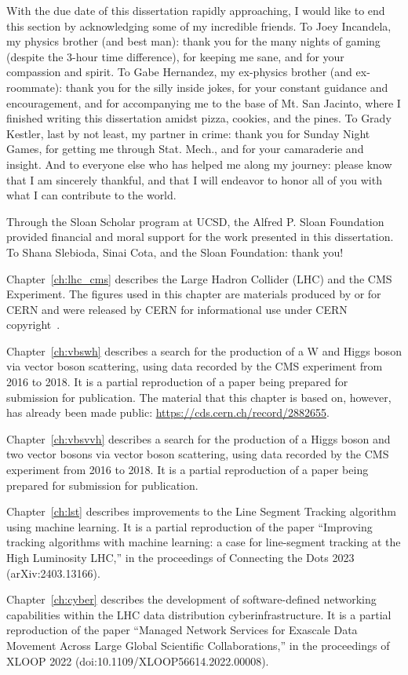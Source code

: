 \begin{acknowledgements}
With the due date of this dissertation rapidly approaching, I would like to end this section by acknowledging some of my incredible friends. 
To Joey Incandela, my physics brother (and best man): thank you for the many nights of gaming (despite the 3-hour time difference), for keeping me sane, and for your compassion and spirit. 
To Gabe Hernandez, my ex-physics brother (and ex-roommate): thank you for the silly inside jokes, for your constant guidance and encouragement, and for accompanying me to the base of Mt. San Jacinto, where I finished writing this dissertation amidst pizza, cookies, and the pines. 
To Grady Kestler, last by not least, my partner in crime: thank you for Sunday Night Games, for getting me through Stat. Mech., and for your camaraderie and insight. 
And to everyone else who has helped me along my journey: please know that I am sincerely thankful, and that I will endeavor to honor all of you with what I can contribute to the world. 

Through the Sloan Scholar program at UCSD, the Alfred P. Sloan Foundation provided financial and moral support for the work presented in this dissertation. 
To Shana Slebioda, Sinai Cota, and the Sloan Foundation: thank you!

Chapter~\ref{ch:lhc_cms} describes the Large Hadron Collider (LHC) and the CMS Experiment. 
The figures used in this chapter are materials produced by or for CERN and were released by CERN for informational use under CERN copyright~\cite{CERNCopyright}. 

Chapter~\ref{ch:vbswh} describes a search for the production of a W and Higgs boson via vector boson scattering, using data recorded by the CMS experiment from 2016 to 2018. 
It is a partial reproduction of a paper being prepared for submission for publication. 
The material that this chapter is based on, however, has already been made public: \url{https://cds.cern.ch/record/2882655}.

Chapter~\ref{ch:vbsvvh} describes a search for the production of a Higgs boson and two vector bosons via vector boson scattering, using data recorded by the CMS experiment from 2016 to 2018. 
It is a partial reproduction of a paper being prepared for submission for publication. 

Chapter~\ref{ch:lst} describes improvements to the Line Segment Tracking algorithm using machine learning. 
It is a partial reproduction of the paper ``Improving tracking algorithms with machine learning: a case for line-segment tracking at the High Luminosity LHC,'' in the proceedings of Connecting the Dots 2023 (arXiv:2403.13166). 

Chapter~\ref{ch:cyber} describes the development of software-defined networking capabilities within the LHC data distribution cyberinfrastructure. 
It is a partial reproduction of the paper ``Managed Network Services for Exascale Data Movement Across Large Global Scientific Collaborations,'' in the proceedings of XLOOP 2022 (doi:10.1109/XLOOP56614.2022.00008). 

\end{acknowledgements}
